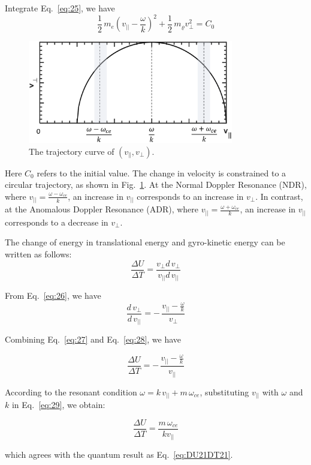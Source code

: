\documentclass{cpbtex3}
\begin{document}
Integrate Eq.~\eqref{eq:25}, we have
\begin{equation}
\frac{1}{2}\,m_e\left(v_{||}-\frac{\omega}{k}\right)^{2}+\frac{1}{2}\,m_{\varrho}v_{\perp}^{2}=C_{0}
\label{eq:26}
\end{equation}
\begin{figure}[htbp]
\centering
\includegraphics[width=0.8\textwidth]{Figure8.eps}%
\caption{\label{fig:8}The trajectory curve of $ (v_\parallel,v_\perp)$.}
\end{figure}
Here $C_{0}$ refers to the initial value. The change in velocity is constrained to a circular trajectory, as shown in Fig.~\ref{fig:8}. At the Normal Doppler Resonance (NDR), where $v_{||}=\frac{\omega-\omega_{ce}}{k}$, an increase in $v_{||}$ corresponds to an increase in $v_{\perp}$. In contrast, at the Anomalous Doppler Resonance (ADR), where $v_{||}=\frac{\omega+\omega_{ce}}{k}$, an increase in $v_{||}$ corresponds to a decrease in $v_{\perp}$.

The change of energy in translational energy and gyro-kinetic energy can be written as follows:
\begin{equation}
\frac{\Delta U}{\Delta T}=\frac{v_{\perp}d\,v_{\perp}}{v_{||}d\,v_{||}}
\label{eq:27}
\end{equation}

From Eq.~\eqref{eq:26}, we have
\begin{equation}
\frac{d\,v_{\perp}}{d\,v_{||}}=-\,\frac{v_{||}-\frac{\omega}{k}}{v_{\perp}}
\label{eq:28}
\end{equation}

Combining Eq.~\eqref{eq:27} and Eq.~\eqref{eq:28}, we have

\begin{equation}
\frac{\Delta U}{\Delta T}=-\,\frac{v_{||}-\frac{\omega}{k}}{v_{||}}
\label{eq:29}
\end{equation}

According to the resonant condition $\omega=k\,v_{||}+m\,\omega_{ce}$, substituting $v_{||}$ with $\omega$ and $k$ in Eq.~\eqref{eq:29}, we obtain:

\begin{equation}
\frac{\Delta U}{\Delta T}=\frac{m\,\omega_{ce}}{kv_{||}}
\label{eq:30}
\end{equation}

which agrees with the quantum result as Eq.~\ref{eq:DU21DT21}.



\end{document}
